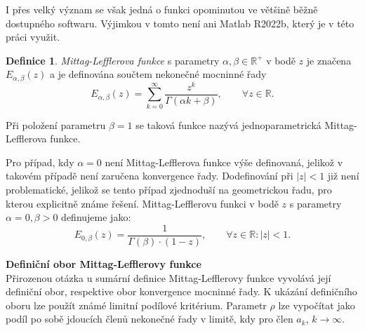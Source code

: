 \documentclass[a4paper,12pt,twoside]{article}
\theoremstyle{definition}
\newtheorem{defin}[veta]{Definice}
\theoremstyle{remark}
\numberwithin{equation}{section}
\numberwithin{table}{section}
\numberwithin{figure}{section}
\newcommand{\R}{\mathbb{R}}
\begin{document}
I přes velký význam se však jedná o funkci opominutou ve většině běžně dostupného softwaru. Výjimkou v tomto není ani Matlab R2022b, který je v této práci využit.

\begin{defin}\label{DefinMLfce} %
	\emph{Mittag-Lefflerova funkce} s parametry $\alpha, \beta \in \R^{+}$ v bodě $z$ je značena $E_{\alpha, \beta} \left( z\right)$ a je definována součtem nekonečné mocninné řady
	$$
	E_{\alpha, \beta} \left( z\right) =  \sum_{k=0}^{\infty} \frac{z^{k}}{\Gamma\left( \alpha k +\beta \right)}, \qquad \forall z \in  \R.  	
	$$
\end{defin}

Při položení parametru $\beta = 1$ se taková funkce nazývá jednoparametrická Mittag-Lefflerova funkce.


Pro případ, kdy $\alpha = 0$ není Mittag-Lefflerova funkce výše definovaná, jelikož v takovém případě není zaručena konvergence řady. Dodefinování při $|z| < 1$ již není problematické, jelikož se tento případ zjednoduší na geometrickou řadu, pro kterou explicitně známe řešení. Mittag-Lefflerovu funkci v bodě $z$ s parametry $\alpha = 0, \beta > 0$ definujeme jako:
\begin{equation}
	E_{0, \beta}\left(z\right) = \frac{1}{\Gamma \left(\beta\right)\cdot \left(1-z\right)}, \qquad \forall z \in \R: |z| < 1.
\end{equation}

\textbf{Definiční obor Mittag-Lefflerovy funkce} \\
Přirozenou otázka u sumární definice Mittag-Lefflerovy funkce vyvolává její definiční obor, respektive obor konvergence mocninné řady. 
K ukázání definičního oboru lze použít známé limitní podílové kritérium. Parametr $\rho$ lze vypočítat jako podíl po sobě jdoucích členů nekonečné řady v limitě, kdy pro člen $a_k$, $k \rightarrow \infty $.
\end{document}
